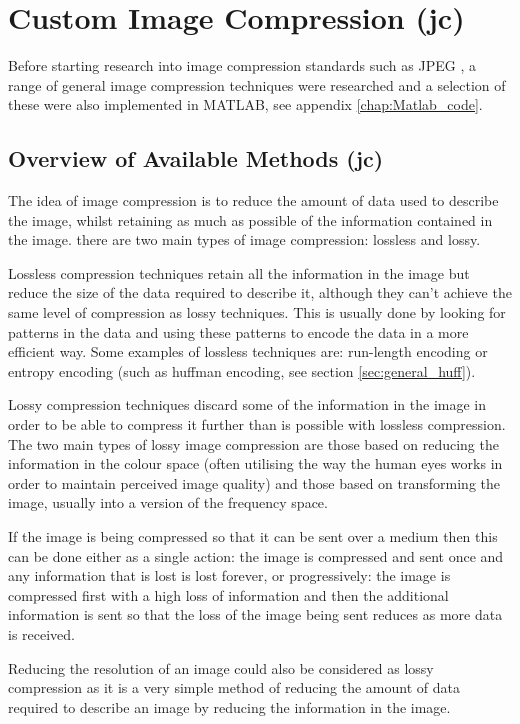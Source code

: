 \section{Custom Image Compression (jc)}
\label{Custom_comp_research}

Before starting research into image compression standards such as JPEG \cite{exif_std}, a range of general image compression techniques were researched and a selection of these were also implemented in MATLAB, see appendix \ref{chap:Matlab_code}.

\subsection{Overview of Available Methods (jc)}

The idea of image compression is to reduce the amount of data used to describe the image, whilst retaining as much as possible of the information contained in the image. there are two main types of image compression: lossless and lossy.

Lossless compression techniques retain all the information in the image but reduce the size of the data required to describe it, although they can't achieve the same level of compression as lossy techniques. This is usually done by looking for patterns in the data and using these patterns to encode the data in a more efficient way. Some examples of lossless techniques are: run-length encoding or entropy encoding (such as huffman encoding, see section \ref{sec:general_huff}).

Lossy compression techniques discard some of the information in the image in order to be able to compress it further than is possible with lossless compression. The two main types of lossy image compression are those based on reducing the information in the colour space (often utilising the way the human eyes works in order to maintain perceived image quality) and those based on transforming the image, usually into a version of the frequency space.

If the image is being compressed so that it can be sent over a medium then this can be done either as a single action: the image is compressed and sent once and any information that is lost is lost forever, or progressively: the image is compressed first with a high loss of information and then the additional information is sent so that the loss of the image being sent reduces as more data is received.

Reducing the resolution of an image could also be considered as lossy compression as it is a very simple method of reducing the amount of data required to describe an image by reducing the information in the image.

